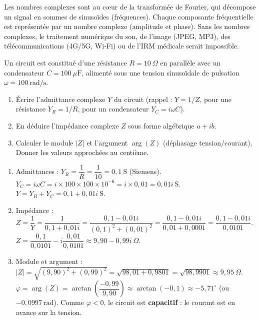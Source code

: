 \documentclass[11pt]{article}
\newcounter{popsec}
\newcounter{popsub}
\newcommand{\courssub}[1]{%
  \stepcounter{popsub}%
  \par\vspace{9pt}\noindent{\popxbold\fontsize{11.5}{13}\selectfont\color{popink}{\color{poporange}\thepopsec.\thepopsub}\hspace{6pt}#1}\par\nopagebreak\vspace{4pt}
}
\begin{document}
\begin{savaistu}
Les nombres complexes sont au cœur de la transformée de Fourier, qui décompose un signal en sommes de sinusoïdes (fréquences). Chaque composante fréquentielle est représentée par un nombre complexe (amplitude et phase). Sans les nombres complexes, le traitement numérique du son, de l'image (JPEG, MP3), des télécommunications (4G/5G, Wi‑Fi) ou de l'IRM médicale serait impossible.
\end{savaistu}

\courssub{Exercices type Probatoire}

\begin{exercice}
Un circuit est constitué d'une résistance $R = 10\ \Omega$ en parallèle avec un condensateur $C = 100\ \mu\text{F}$, alimenté sous une tension sinusoïdale de pulsation $\omega = 100\ \text{rad/s}$.
\begin{enumerate}
\item Écrire l'admittance complexe $Y$ du circuit (rappel : $Y = 1/Z$, pour une résistance $Y_R = 1/R$, pour un condensateur $Y_C = i\omega C$).
\item En déduire l'impédance complexe $Z$ sous forme algébrique $a+ib$.
\item Calculer le module $|Z|$ et l'argument $\arg(Z)$ (déphasage tension/courant). Donner les valeurs approchées au centième.
\end{enumerate}
\end{exercice}

\begin{corrige}
\begin{enumerate}
\item Admittances :
$Y_R = \dfrac{1}{R} = \dfrac{1}{10} = 0,1\ \text{S}$ (Siemens).
$Y_C = i\omega C = i \times 100 \times 100\times10^{-6} = i \times 0,01 = 0,01i\ \text{S}$.
$Y = Y_R + Y_C = 0,1 + 0,01i\ \text{S}$.
\item Impédance :
$Z = \dfrac{1}{Y} = \dfrac{1}{0,1 + 0,01i} = \dfrac{0,1 - 0,01i}{(0,1)^2 + (0,01)^2} = \dfrac{0,1 - 0,01i}{0,01 + 0,0001} = \dfrac{0,1 - 0,01i}{0,0101}$.
$Z = \dfrac{0,1}{0,0101} - i\dfrac{0,01}{0,0101} \approx 9,90 - 0,99i\ \Omega$.
\item Module et argument :
$|Z| = \sqrt{(9,90)^2 + (0,99)^2} = \sqrt{98,01 + 0,9801} = \sqrt{98,9901} \approx 9,95\ \Omega$.
$\varphi = \arg(Z) = \arctan\left(\dfrac{-0,99}{9,90}\right) \approx \arctan(-0,1) \approx -5,71^\circ$ (ou $-0,0997\ \text{rad}$).
Comme $\varphi < 0$, le circuit est \textbf{capacitif} : le courant est en avance sur la tension.
\end{enumerate}
\end{corrige}
\end{document}
